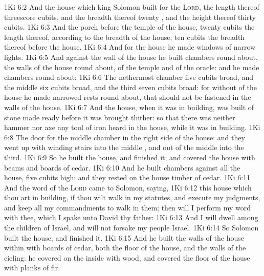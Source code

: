 \vs 1Ki 6:2 And the house which king Solomon built for the \textsc{Lord}, the length thereof  threescore cubits, and the breadth thereof twenty , and the height thereof thirty cubits.
\vs 1Ki 6:3 And the porch before the temple of the house, twenty cubits  the length thereof, according to the breadth of the house;  ten cubits  the breadth thereof before the house.
\vs 1Ki 6:4 And for the house he made windows of narrow lights.
\vs 1Ki 6:5 And against the wall of the house he built chambers round about,  the walls of the house round about,  of the temple and of the oracle: and he made chambers round about:
\vs 1Ki 6:6 The nethermost chamber  five cubits broad, and the middle  six cubits broad, and the third  seven cubits broad: for without  of the house he made narrowed rests round about, that  should not be fastened in the walls of the house.
\vs 1Ki 6:7 And the house, when it was in building, was built of stone made ready before it was brought thither: so that there was neither hammer nor axe  any tool of iron heard in the house, while it was in building.
\vs 1Ki 6:8 The door for the middle chamber  in the right side of the house: and they went up with winding stairs into the middle , and out of the middle into the third.
\vs 1Ki 6:9 So he built the house, and finished it; and covered the house with beams and boards of cedar.
\vs 1Ki 6:10 And  he built chambers against all the house, five cubits high: and they rested on the house  timber of cedar.
\vs 1Ki 6:11 And the word of the \textsc{Lord} came to Solomon, saying,
\vs 1Ki 6:12  this house which thou art in building, if thou wilt walk in my statutes, and execute my judgments, and keep all my commandments to walk in them; then will I perform my word with thee, which I spake unto David thy father:
\vs 1Ki 6:13 And I will dwell among the children of Israel, and will not forsake my people Israel.
\vs 1Ki 6:14 So Solomon built the house, and finished it.
\vs 1Ki 6:15 And he built the walls of the house within with boards of cedar, both the floor of the house, and the walls of the cieling:  he covered  on the inside with wood, and covered the floor of the house with planks of fir.
